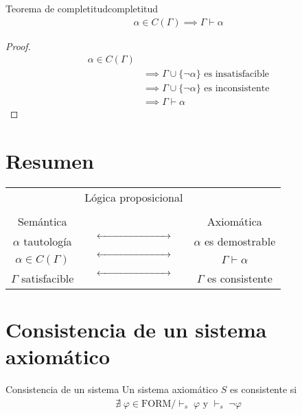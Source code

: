 \begin{teorema}{Teorema de completitud}{completitud}
   \begin{gather*}
       \alpha \in C(\Gamma) \implies \Gamma \vdash \alpha
   \end{gather*} 
\end{teorema}


\begin{proof} \phantom{.}

    \begin{align*}
        \alpha \in C(\Gamma) & \\
        &\implies \Gamma \cup \{ \neg\alpha \} \text{ es insatisfacible} \\
        &\implies \Gamma \cup \{\neg\alpha\} \text{ es inconsistente} \\
        &\implies \Gamma \vdash \alpha
    \end{align*}
\end{proof}

\section{Resumen}

\begin{center}
   \renewcommand{\arraystretch}{1.5}
    \begin{tabular}{c c c}
        & Lógica proposicional & \\
        && \\
        Semántica & & Axiomática \\
        $\alpha$ tautología & 
        $\xleftrightarrow[\text{\phantom{Lógica proposicional}}]{}$ & 
        $\alpha$ es demostrable \\
        $\alpha \in C(\Gamma)$ & 
        $\xleftrightarrow[\text{\phantom{Lógica proposicional}}]{}$ & 
        $\Gamma \vdash \alpha$ \\
        $\Gamma$ satisfacible & 
        $\xleftrightarrow[\text{\phantom{Lógica proposicional}}]{}$ & 
        $\Gamma$ es consistente
    \end{tabular}
\end{center}

\section{Consistencia de un sistema axiomático}

\begin{definicion}{Consistencia de un sistema}{}
    Un sistema axiomático $S$ es consistente si
    \begin{gather*}
        \nexists \; \varphi \in \mathrm{FORM} / {\vdash}_{s}\; \varphi 
        \text{ y } {\vdash}_{s}\; \neg\varphi
    \end{gather*}

\end{definicion}

